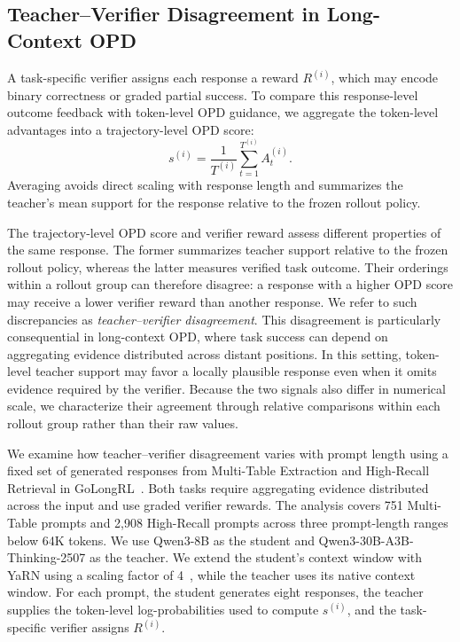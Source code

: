 \subsection{Teacher--Verifier Disagreement in Long-Context OPD}
\label{sec:obs}

A task-specific verifier assigns each response a reward $R^{(i)}$, which may encode binary correctness or graded partial success. To compare this response-level outcome feedback with token-level OPD guidance, we aggregate the token-level advantages into a trajectory-level OPD score:
\begin{equation}
s^{(i)}=\frac{1}{T^{(i)}}\sum_{t=1}^{T^{(i)}}A^{(i)}_t.
\label{eq:trajectory-opd-score}
\end{equation}
Averaging avoids direct scaling with response length and summarizes the teacher's mean support for the response relative to the frozen rollout policy.

The trajectory-level OPD score and verifier reward assess different properties of the same response. The former summarizes teacher support relative to the frozen rollout policy, whereas the latter measures verified task outcome. Their orderings within a rollout group can therefore disagree: a response with a higher OPD score may receive a lower verifier reward than another response. We refer to such discrepancies as \emph{teacher--verifier disagreement}. This disagreement is particularly consequential in long-context OPD, where task success can depend on aggregating evidence distributed across distant positions. In this setting, token-level teacher support may favor a locally plausible response even when it omits evidence required by the verifier. Because the two signals also differ in numerical scale, we characterize their agreement through relative comparisons within each rollout group rather than their raw values.

We examine how teacher--verifier disagreement varies with prompt length using a fixed set of generated responses from Multi-Table Extraction and High-Recall Retrieval in GoLongRL~\citep{lv2026golongrl}. Both tasks require aggregating evidence distributed across the input and use graded verifier rewards. The analysis covers 751 Multi-Table prompts and 2{,}908 High-Recall prompts across three prompt-length ranges below 64K tokens. We use Qwen3-8B as the student and Qwen3-30B-A3B-Thinking-2507 as the teacher. We extend the student's context window with YaRN using a scaling factor of 4~\citep{peng2024yarn}, while the teacher uses its native context window. For each prompt, the student generates eight responses, the teacher supplies the token-level log-probabilities used to compute $s^{(i)}$, and the task-specific verifier assigns $R^{(i)}$.

